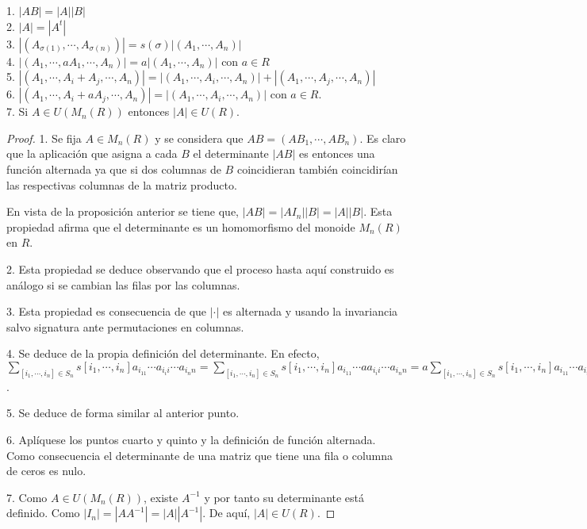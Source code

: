 \begin{corollary}
1. $|AB| = |A||B|$ \\
2. $|A| = |A^t|$ \\
3. $|(A_{\sigma(1)},\cdots,A_{\sigma(n)})| = s(\sigma) |(A_1,\cdots,A_n)|$ \\
4. $|(A_1,\cdots,aA_1,\cdots,A_n)| = a|(A_1,\cdots,A_n)|$ con $a \in R$ \\
5. $|(A_1,\cdots,A_i+A_j,\cdots,A_n)| = |(A_1,\cdots,A_i,\cdots,A_n)|+|(A_1,\cdots,A_j,\cdots,A_n)|$ \\
6. $|(A_1,\cdots,A_i+aA_j,\cdots,A_n)| = |(A_1,\cdots,A_i,\cdots,A_n)|$ con $a \in R$. \\
7. Si $A \in U(M_n(R))$ entonces $|A| \in U(R)$.
\end{corollary}
\begin{proof}
1. Se fija $A \in M_n(R)$ y se considera que $AB = (AB_1,\cdots,AB_n)$. Es claro que la aplicación que asigna a cada $B$ el determinante $|AB|$ es entonces una función alternada ya que si dos columnas de $B$ coincidieran también coincidirían las respectivas columnas de la matriz producto. 

En vista de la proposición anterior se tiene que, $|AB| = |AI_n| |B| = |A||B|$. Esta propiedad afirma que el determinante es un homomorfismo del monoide $M_n(R)$ en $R$.

2. Esta propiedad se deduce observando que el proceso hasta aquí construido es análogo si se cambian las filas por las columnas.

3. Esta propiedad es consecuencia de que $|\cdot|$ es alternada y usando la invariancia salvo signatura ante permutaciones en columnas.

4. Se deduce de la propia definición del determinante. En efecto, $\sum_{[i_1,\cdots,i_n] \in S_n} s[i_1,\cdots,i_n] a_{i_11} \cdots a_{i_ii}\cdots a_{i_nn} = \sum_{[i_1,\cdots,i_n] \in S_n} s[i_1,\cdots,i_n] a_{i_11} \cdots aa_{i_ii}\cdots a_{i_nn} = a\sum_{[i_1,\cdots,i_n] \in S_n} s[i_1,\cdots,i_n] a_{i_11} \cdots a_{i_ii}\cdots a_{i_nn}$.

5. Se deduce de forma similar al anterior punto.

6. Aplíquese los puntos cuarto y quinto y la definición de función alternada. Como consecuencia el determinante de una matriz que tiene una fila o columna de ceros es nulo. 

7. Como  $A \in U(M_n(R))$, existe $A^{-1}$ y por tanto su determinante está definido. Como $|I_n| = |AA^{-1}| = |A||A^{-1}|$. De aquí, $|A| \in U(R)$.
\end{proof}

